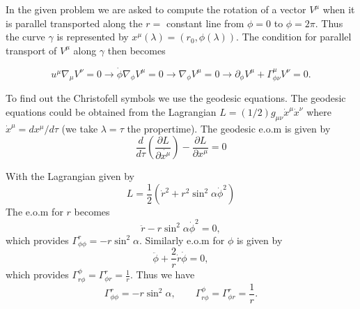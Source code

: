 \documentclass[fleqn]{article}
\begin{document}
\noindent{}

\vspace{0.5cm}

In the given problem we are asked to compute the rotation of a vector $V^\mu$ when it is parallel transported along the $r=$ constant line from $\phi=0$ to $\phi=2\pi$. Thus the curve $\gamma$ is represented by $x^\mu(\lambda) = (r_0, \phi(\lambda))$. The condition for parallel transport of $V^\mu$ along $\gamma$ then becomes

\begin{equation}
  \label{eq:parallel-transport-along-r-constant}
  u^\mu\nabla_\mu V^\nu = 0 \to \dot{\phi}\nabla_\phi V^\mu = 0\to \nabla_\phi V^\mu = 0 \to \boxed{\partial_\phi V^\mu + \Gamma^\mu_{\phi \nu} V^\nu = 0}.
\end{equation}

To find out the Christofell symbols we use the geodesic equations. The geodesic equations could be obtained from the Lagrangian $L = (1/2)g_{\mu\nu}\dot{x}^\mu\dot{x}^\nu$ where $\dot{x}^\mu = dx^\mu/d\tau$ (we take $\lambda = \tau$ the propertime). The geodesic e.o.m is given by
\begin{equation}
  \label{eq:geodesic-eom}
  \frac{d}{d\tau}\left(\frac{\partial L}{\partial \dot{x^\mu}}\right) - \frac{\partial L}{\partial x^\mu} = 0
\end{equation}

With the Lagrangian given by
\begin{equation}
  \label{eq:Lagrangian}
  L = \frac{1}{2}(\dot{r}^2 + r^2\sin^2\alpha\dot{\phi}^{2})
\end{equation}
The e.o.m for $r$ becomes
\begin{equation}
  \label{eq:eom-r}
  \ddot{r} - r\sin^2\alpha \dot{\phi}^{2} = 0,
\end{equation}
which provides $\Gamma^{r}_{\phi\phi} = - r\sin^2\alpha$.
Similarly e.o.m for $\phi$ is given by
\begin{equation}
  \label{eq:eom-phi}
  \ddot{\phi} + \frac{2}{r}\dot{r}\dot{\phi} = 0,
\end{equation}
which provides $\Gamma^{\phi}_{r\phi} = \Gamma^{r}_{\phi r} = \frac{1}{r}$. Thus we have
\begin{equation}
  \label{eq:Christofell-symbols}
  \boxed{\Gamma^{r}_{\phi\phi} = - r\sin^2\alpha,\qquad \Gamma^{\phi}_{r\phi} = \Gamma^{r}_{\phi r} = \frac{1}{r}}.
\end{equation}
\end{document}
